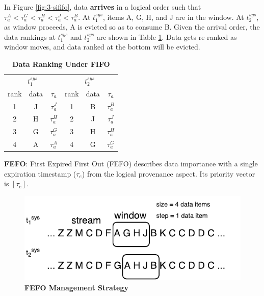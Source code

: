 In Figure \ref{fig:3-sififo}, data \textbf{arrives} in a logical order such that $\tau^{A}_{a} < \tau^{G}_{a} < \tau^{H}_{a} < \tau^{J}_{a} < \tau^{B}_{a}$.
At $t^{sys}_{1}$, items A, G, H, and J are in the window. 
At $t^{sys}_{2}$, as window proceeds, A is evicted so as to consume B. 
Given the arrival order, the data rankings at $t^{sys}_{1}$ and $t^{sys}_{2}$ are shown in Table \ref{tab:fifo}.
Data gets re-ranked as window moves, and data ranked at the bottom will be evicted.

\begin{table}[!htbp]
\centering
\caption{\textbf{Data Ranking Under FIFO}}
\label{tab:fifo}
\begin{tabular}{|c|c|c||c|c|c|}
\hline
\multicolumn{3}{|c||}{$t^{sys}_{1}$} & \multicolumn{3}{c|}{$t^{sys}_{2}$} \\ \hhline{|===#===|}
rank & data & $\tau_{a}$ & rank & data & $\tau_{a}$ \\ \hhline{|=|=|=#=|=|=|}
1 & J & $\tau^{J}_{a}$ & 1 & B & $\tau^{B}_{a}$ \\ \hline
2 & H & $\tau^{H}_{a}$ & 2 & J & $\tau^{J}_{a}$ \\ \hline
3 & G & $\tau^{G}_{a}$ & 3 & H & $\tau^{H}_{a}$ \\ \hline
4 & A & $\tau^{A}_{a}$ & 4 & G & $\tau^{G}_{a}$ \\ \hline
\end{tabular}
\end{table}

\textbf{FEFO}:
First Expired First Out (FEFO) describes data importance with a single expiration timestamp ($\tau_{e}$) from the logical provenance aspect. 
Its priority vector is $[\tau_{e}]$.

\begin{figure}[!htbp]
	\centering
    \includegraphics[width=5in]{img/3-sifefo.pdf}
    \caption{\textbf{FEFO Management Strategy}}
    \label{fig:3-sifefo}
\end{figure}

